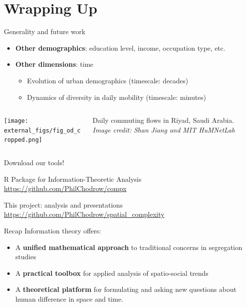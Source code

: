 \documentclass{beamer}
\begin{document}
\section{Wrapping Up}
	\begin{frame}{Generality and future work}
	
		\begin{itemize}
			\item \textbf{Other demographics}: education level, income, occupation type, etc.
			\item \textbf{Other dimensions}: time
				\begin{itemize}
					\item Evolution of urban demographics (timescale: decades)
					\item Dynamics of diversity in daily mobility (timescale: minutes)
				\end{itemize}
		\end{itemize}
	\vspace{5mm}
		\begin{columns}
			\begin{column}{0.3\textwidth}
				\texttt{[image: external\_figs/fig\_od\_cropped.png]}
			\end{column}
			\begin{column}{0.4\textwidth}  
			     Daily commuting flows in Riyad, Saudi Arabia. \emph{Image credit: Shan Jiang and MIT HuMNetLab}
			\end{column}
		\end{columns}
	\end{frame}
	\begin{frame}{Download our tools!}
		\begin{block}{R Package for Information-Theoretic Analysis}
			\url{https://github.com/PhilChodrow/compx}
		\end{block}
		\begin{block}{This project: analysis and presentations}
			\url{https://github.com/PhilChodrow/spatial_complexity}
		\end{block}
	\end{frame}
	\iflong
	\begin{frame}{Recap}
		Information theory offers:
		\begin{itemize}
			\item A \textbf{unified mathematical approach} to traditional concerns in segregation studies
			\item A \textbf{practical toolbox} for applied analysis of spatio-social trends
			\item A \textbf{theoretical platform} for formulating and asking new questions about human difference in space and time. 
		\end{itemize}
	\end{frame}
\end{document}
